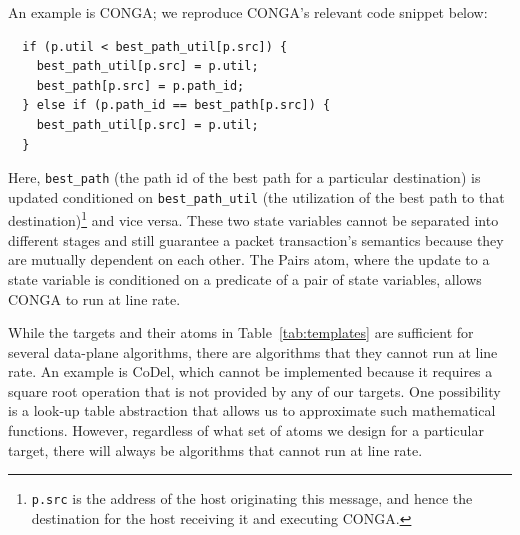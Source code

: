 An example is CONGA; we reproduce CONGA's relevant code snippet below:
\begin{verbatim}
  if (p.util < best_path_util[p.src]) {
    best_path_util[p.src] = p.util;
    best_path[p.src] = p.path_id;
  } else if (p.path_id == best_path[p.src]) {
    best_path_util[p.src] = p.util;
  }
\end{verbatim}
Here, \texttt{best\_path} (the path id of the best path for a particular
destination) is updated conditioned on \texttt{best\_path\_util} (the
utilization of the best path to that destination)\footnote{{\tt p.src} is the
address of the host originating this message, and hence the destination for the
host receiving it and executing CONGA.} and vice versa. These two state
variables cannot be separated into different stages and still guarantee a
packet transaction's semantics because they are mutually dependent on each
other.  The Pairs atom, where the update to a state variable is conditioned on
a predicate of a pair of state variables, allows CONGA to run at line rate.

While the targets and their atoms in Table~\ref{tab:templates} are sufficient
for several data-plane algorithms, there are algorithms that they cannot run at
line rate.  An example is CoDel, which cannot be implemented because it
requires a square root operation that is not provided by any of our targets.
One possibility is a look-up table abstraction that allows us to approximate
such mathematical functions. However, regardless of what set of atoms we design
for a particular target, there will always be algorithms that cannot run at
line rate.


